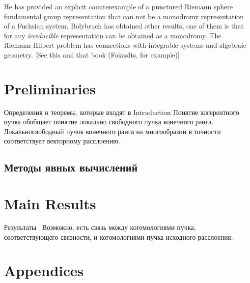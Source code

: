 \documentclass[11pt]{article}
\begin{document}
    He has provided an explicit counterexample of a punctured Riemann sphere fundamental
    group representation that can not be a monodromy
    representation of a Fuchsian system.
    Bolybruch has obtained other results, one of them is that for
    any \textit{irreducible} representation can be obtained as a monodromy.
    The Riemann-Hilbert problem has connections with integrable systems and
    algebraic geometry.
    [See this and that book (FokasIts, for example)]




    \section{Preliminaries} \label{sec:prelim}
       Определения и теоремы, которые входят в Introduction
        Понятие когерентного пучка обобщает понятие локально
       свободного пучка конечного ранга.
        Локальносвободный пучок конечного ранга на многообразии
        в точности соответствует векторному расслоению.
    \subsection{Методы явных вычислений}\label{subsec:методы-явных-вычислений}



    \section{Main Results}\label{sec:main-results}
        Результаты~
    Возможно, есть связь между когомологиями пучка, соответствующего связности,
    и когомологиями пучка исходного расслоения.




    \section{Appendices}\label{sec:appendices}
\end{document}
